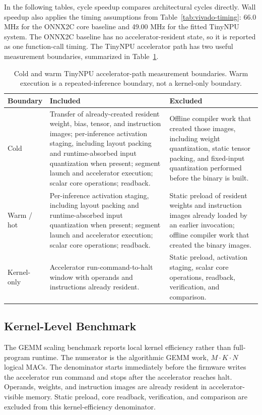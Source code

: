 \documentclass[a4paper, 12pt, titlepage]{article}
\begin{document}
In the following tables, cycle speedup compares architectural cycles directly. Wall speedup also applies the timing assumptions from Table~\ref{tab:vivado-timing}: 66.0 MHz for the ONNX2C core baseline and 49.00 MHz for the fitted TinyNPU system. The ONNX2C baseline has no accelerator-resident state, so it is reported as one function-call timing. The TinyNPU accelerator path has two useful measurement boundaries, summarized in Table~\ref{tab:cold-warm-boundary}.

\begin{table}[H]
    \centering
    \footnotesize
    \caption{Cold and warm TinyNPU accelerator-path measurement boundaries. Warm execution is a repeated-inference boundary, not a kernel-only boundary.}
    \label{tab:cold-warm-boundary}
    \begin{tabular}{|l|p{}|p{}|}
        \hline
        \textbf{Boundary} & \textbf{Included} & \textbf{Excluded} \\
        \hline
        Cold & Transfer of already-created resident weight, bias, tensor, and instruction images; per-inference activation staging, including layout packing and runtime-absorbed input quantization when present; segment launch and accelerator execution; scalar core operations; readback. & Offline compiler work that created those images, including weight quantization, static tensor packing, and fixed-input quantization performed before the binary is built. \\
        \hline
        Warm / hot & Per-inference activation staging, including layout packing and runtime-absorbed input quantization when present; segment launch and accelerator execution; scalar core operations; readback. & Static preload of resident weights and instruction images already loaded by an earlier invocation; offline compiler work that created the binary images. \\
        \hline
        Kernel-only & Accelerator run-command-to-halt window with operands and instructions already resident. & Static preload, activation staging, scalar core operations, readback, verification, and comparison. \\
        \hline
    \end{tabular}
\end{table}

\subsection{Kernel-Level Benchmark}
The GEMM scaling benchmark reports local kernel efficiency rather than full-program runtime. The numerator is the algorithmic GEMM work, \(M \cdot K \cdot N\) logical MACs. The denominator starts immediately before the firmware writes the accelerator run command and stops after the accelerator reaches halt. Operands, weights, and instruction images are already resident in accelerator-visible memory. Static preload, core readback, verification, and comparison are excluded from this kernel-efficiency denominator.
\end{document}
